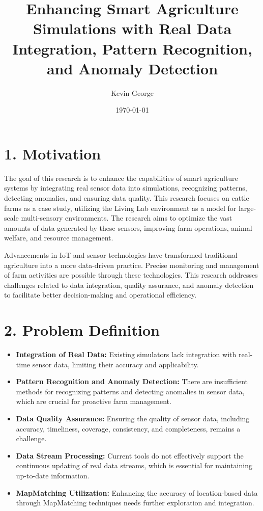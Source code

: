 \documentclass[12pt]{article}
\title{Enhancing Smart Agriculture Simulations with Real Data Integration, Pattern Recognition, and Anomaly Detection}
\author{Kevin George}
\date{\today}
\begin{document}
\maketitle

\section*{1. Motivation}
The goal of this research is to enhance the capabilities of smart agriculture systems by integrating real sensor data into simulations, recognizing patterns, detecting anomalies, and ensuring data quality. This research focuses on cattle farms as a case study, utilizing the Living Lab environment as a model for large-scale multi-sensory environments. The research aims to optimize the vast amounts of data generated by these sensors, improving farm operations, animal welfare, and resource management.

Advancements in IoT and sensor technologies have transformed traditional agriculture into a more data-driven practice. Precise monitoring and management of farm activities are possible through these technologies. This research addresses challenges related to data integration, quality assurance, and anomaly detection to facilitate better decision-making and operational efficiency.

\section*{2. Problem Definition}
\begin{itemize}
    \item \textbf{Integration of Real Data:} Existing simulators lack integration with real-time sensor data, limiting their accuracy and applicability.
    \item \textbf{Pattern Recognition and Anomaly Detection:} There are insufficient methods for recognizing patterns and detecting anomalies in sensor data, which are crucial for proactive farm management.
    \item \textbf{Data Quality Assurance:} Ensuring the quality of sensor data, including accuracy, timeliness, coverage, consistency, and completeness, remains a challenge.
    \item \textbf{Data Stream Processing:} Current tools do not effectively support the continuous updating of real data streams, which is essential for maintaining up-to-date information.
    \item \textbf{MapMatching Utilization:} Enhancing the accuracy of location-based data through MapMatching techniques needs further exploration and integration.
\end{itemize}
\end{document}
